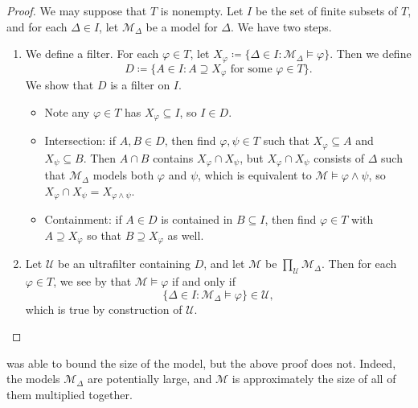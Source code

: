 \documentclass[../notes.tex]{subfiles}
\begin{document}
\begin{proof}
	We may suppose that $T$ is nonempty. Let $I$ be the set of finite subsets of $T$, and for each $\Delta\in I$, let $\mathcal M_\Delta$ be a model for $\Delta$. We have two steps.
	\begin{enumerate}
		\item We define a filter. For each $\varphi\in T$, let $X_\varphi\coloneqq\{\Delta\in I:\mathcal M_\Delta\models\varphi\}$. Then we define
		\[D\coloneqq\{A\in I:A\supseteq X_\varphi\text{ for some }\varphi\in T\}.\]
		We show that $D$ is a filter on $I$.
		\begin{itemize}
			\item Note any $\varphi\in T$ has $X_\varphi\subseteq I$, so $I\in D$.
			\item Intersection: if $A,B\in D$, then find $\varphi,\psi\in T$ such that $X_\varphi\subseteq A$ and $X_\psi\subseteq B$. Then $A\cap B$ contains $X_{\varphi}\cap X_\psi$, but $X_\varphi\cap X_\psi$ consists of $\Delta$ such that $\mathcal M_\Delta$ models both $\varphi$ and $\psi$, which is equivalent to $\mathcal M\models\varphi\land\psi$, so $X_\varphi\cap X_\psi=X_{\varphi\land\psi}$.
			\item Containment: if $A\in D$ is contained in $B\subseteq I$, then find $\varphi\in T$ with $A\supseteq X_\varphi$ so that $B\supseteq X_\varphi$ as well.
		\end{itemize}
		\item Let $\mathcal U$ be an ultrafilter containing $D$, and let $\mathcal M$ be $\prod_\mathcal U\mathcal M_\Delta$. Then for each $\varphi\in T$, we see by  that $\mathcal M\models\varphi$ if and only if
		\[\{\Delta\in I:\mathcal M_\Delta\models\varphi\}\in\mathcal U,\]
		which is true by construction of $\mathcal U$.
		\qedhere
	\end{enumerate}
\end{proof}
\begin{remark}
	 was able to bound the size of the model, but the above proof does not. Indeed, the models $\mathcal M_\Delta$ are potentially large, and $\mathcal M$ is approximately the size of all of them multiplied together.
\end{remark}
\end{document}
